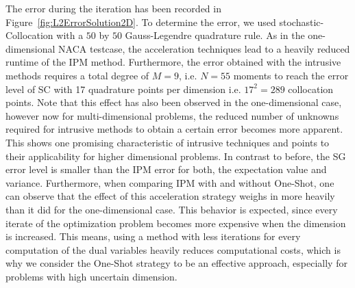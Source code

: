 The error during the iteration has been recorded in Figure~\ref{fig:L2ErrorSolution2D}. To determine the error, we used stochastic-Collocation with a $50$ by $50$ Gauss-Legendre quadrature rule. As in the one-dimensional NACA testcase, the acceleration techniques lead to a heavily reduced runtime of the IPM method. Furthermore, the error obtained with the intrusive methods requires a total degree of $M = 9$, i.e. $N = 55$ moments to reach the error level of SC with 17 quadrature points per dimension i.e. $17^2 = 289$ collocation points. Note that this effect has also been observed in the one-dimensional case, however now for multi-dimensional problems, the reduced number of unknowns required for intrusive methods to obtain a certain error becomes more apparent. This shows one promising characteristic of intrusive techniques and points to their applicability for higher dimensional problems. In contrast to before, the SG error level is smaller than the IPM error for both, the expectation value and variance. Furthermore, when comparing IPM with and without One-Shot, one can observe that the effect of this acceleration strategy weighs in more heavily than it did for the one-dimensional case. This behavior is expected, since every iterate of the optimization problem becomes more expensive when the dimension is increased. This means, using a method with less iterations for every computation of the dual variables heavily reduces computational costs, which is why we consider the One-Shot strategy to be an effective approach, especially for problems with high uncertain dimension.
